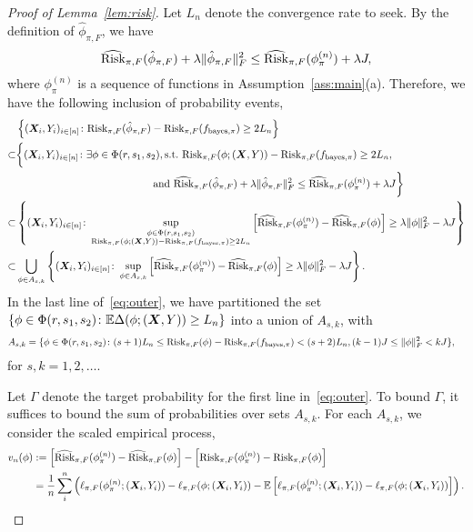 \documentclass[11pt]{article}
\theoremstyle{plain}
\theoremstyle{definition}
\def\bayespif{f_{\textup{bayes},\pi}}
\def\riskF{\textup{Risk}_{\pi,F}}
\def\eriskF{\widehat{\textup{Risk}}_{\pi,F}}
\begin{document}
\begin{proof}[Proof of Lemma~\ref{lem:risk}]
Let $L_n$ denote the convergence rate to seek. By the definition of $\hat \phi_{\pi,F}$, we have
\[
 \eriskF(\hat\phi_{\pi,F})+\lambda\FnormSize{}{\hat \phi_{\pi,F}}^2\leq \eriskF(\phi_{\pi}^{(n)})+\lambda J,
\]
where $\phi_{\pi}^{(n)}$ is a sequence of functions in Assumption~\ref{ass:main}(a). Therefore, we have the following inclusion of probability events,
\begin{align}\label{eq:outer}
&\left\{(\mX_i,Y_i)_{i\in[n]}\colon \riskF(\hat\phi_{\pi,F})-\riskF(\bayespif)\geq 2L_n \right\}\notag \\
 \subset &
 \bigg\{(\mX_i,Y_i)_{i\in[n]}\colon \exists \phi\in\Phi(r,s_1,s_2), \text{s.t.}\  \riskF(\phi; (\mX,Y))-\riskF(\bayespif)\geq 2L_n, \notag \\&\hspace*{4.6cm} \text{and}\  \eriskF(\hat\phi_{\pi,F})+\lambda\FnormSize{}{\hat \phi_{\pi,F}}^2\leq \eriskF(\phi_{\pi}^{(n)})+\lambda J \bigg\}\notag \\
 \subset &
\left\{(\mX_i,Y_i)_{i\in[n]} \colon \sup_{\substack{\phi\in\Phi(r,s_1,s_2)\\  
\riskF(\phi; (\mX,Y))-\riskF(\bayespif)\geq 2L_n  }}\left[\eriskF(\phi_\pi^{(n)})-\eriskF(\phi)\right]\geq \lambda\FnormSize{}{\phi}^2-\lambda J  \right\} \notag \\
\subset & \bigcup_{\phi\in A_{s,k}}\left\{(\mX_i,Y_i)_{i\in[n]}\colon \sup_{\phi\in A_{s,k}} \left[\eriskF(\phi_\pi^{(n)})-\eriskF(\phi)\right]\geq \lambda\FnormSize{}{\phi}^2-\lambda J \right \}.
\end{align}
In the last line of~\eqref{eq:outer}, we have partitioned the set $\{\phi\in\Phi(r,s_1,s_2)\colon \mathbb{E}\Delta(\phi;(\bm X,Y))\geq L_n\}$ into a union of $A_{s,k}$, with 
\begin{align}
A_{s,k}&=\{\phi\in \Phi(r,s_1,s_2)\colon (s+1)L_n\leq \riskF(\phi)-\riskF(\bayespif)< (s+2) L_n, (k-1) J \leq \FnormSize{}{\phi}^2< k J\},
\end{align}
for $s,k=1,2,\ldots$. 


Let $\Gamma$ denote the target probability for the first line in~\eqref{eq:outer}. To bound $\Gamma$, it suffices to bound the sum of probabilities over sets $A_{s,k}$.  For  each $ A_{s,k}$, we consider the scaled empirical process,
\begin{align}\label{eq:empro}
v_n(\phi)&:=\left[\eriskF(\phi_\pi^{(n)})-\eriskF(\phi)\right]-\left[\riskF(\phi_\pi^{(n)})-\riskF(\phi)\right]\\&=\frac{1}{n}\sum_{i}^n\left(\ell_{\pi,F}(\phi_\pi^{(n)};(\mX_i,Y_i))-\ell_{\pi,F}(\phi;(\mX_i,Y_i))-\mathbb{E}\left[\ell_{\pi,F}(\phi_\pi^{(n)};(\mX_i,Y_i))-\ell_{\pi,F}(\phi;(\mX_i,Y_i))\right]\right) .
\end{align}


\end{proof}
\end{document}
